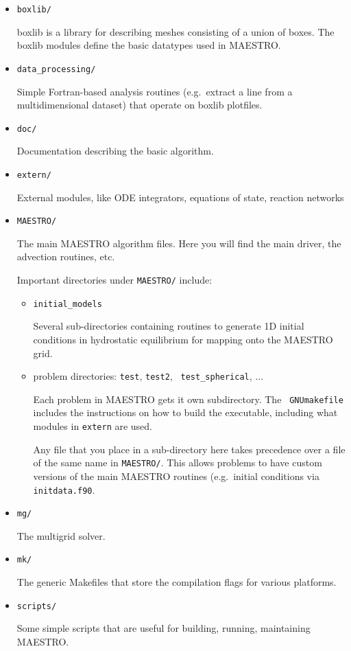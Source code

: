 \begin{itemize}
\item {\tt boxlib/} 

 boxlib is a library for describing meshes consisting of a union
 of boxes.  The boxlib modules define the basic datatypes used
 in MAESTRO.

\item {\tt data\_processing/}

 Simple Fortran-based analysis routines (e.g.\ extract a line from a
 multidimensional dataset) that operate on boxlib plotfiles.

\item {\tt doc/}

 Documentation describing the basic algorithm.

\item {\tt extern/}

 External modules, like ODE integrators, equations of state, reaction
 networks

\item {\tt MAESTRO/}

 The main MAESTRO algorithm files.  Here you will find the main driver,
 the advection routines, etc.

 Important directories under {\tt MAESTRO/} include:

 \begin{itemize}

 \item {\tt initial\_models}

   Several sub-directories containing routines to generate
   1D initial conditions in hydrostatic equilibrium for 
   mapping onto the MAESTRO grid.

 \item problem directories: {\tt test}, {\tt test2}, {\tt
   test\_spherical}, $\ldots$

   Each problem in MAESTRO gets it own subdirectory.  The {\tt
   GNUmakefile} includes the instructions on how to build the
   executable, including what modules in {\tt extern} are used.

   Any file that you place in a sub-directory here takes 
   precedence over a file of the same name in {\tt MAESTRO/}.
   This allows problems to have custom versions of the main
   MAESTRO routines (e.g.\ initial conditions via {\tt initdata.f90}.

 \end{itemize}

\item {\tt mg/}

  The multigrid solver.

\item {\tt mk/}

  The generic Makefiles that store the compilation flags for
  various platforms.

\item {\tt scripts/}

  Some simple scripts that are useful for building, running,
  maintaining MAESTRO.

\end{itemize}



